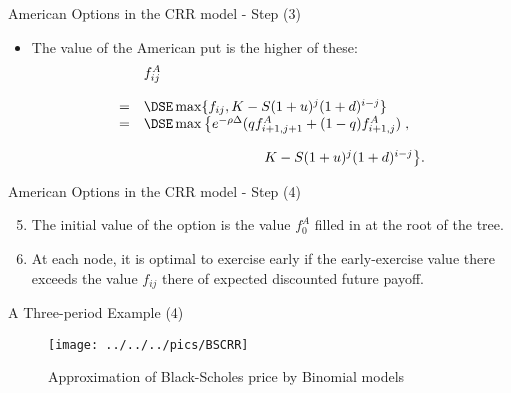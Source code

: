 {American Options in the CRR model - Step (3)}
\begin{itemize}
  \item The value of
the American put is the higher of these:
$$
\begin{array}{ll}
&f^A_{ij} \\*[12pt]=&\DSE \max\{f_{ij}, K - S (1+u)^j (1+d)^{i-j}\}\\
=&\DSE \max\left\{e^{-\rho \Delta} (q f^A_{i+1,j+1} + (1 - q)
f^A_{i+1,j})\right.,\\*[12pt]
&\hspace{3cm} \left. K - S (1+u)^j (1+d)^{i-j}\right\}\!.
\end{array}
$$
\end{itemize}



{American Options in the CRR model - Step (4)}
\begin{enumerate}
\setcounter{enumi}{4}
  \item The initial value of the option is the value $f^A_0$ filled in
at the
root of the tree.
  \item At each node, it is optimal to exercise early if the
early-exercise value there exceeds the value $f_{ij}$ there of
expected discounted future payoff.
\end{enumerate}





{ A Three-period Example (4)}

\begin{figure}[htb]
\begin{center}
  \texttt{[image: ../../../pics/BSCRR]}
\caption{Approximation of Black-Scholes price by Binomial models}
\end{center}\label{BSCRR}
\end{figure}






